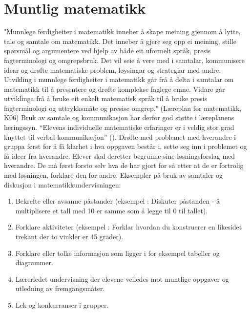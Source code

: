 \documentclass[12pt,twoside,onecolumn,norsk]{article}
\begin{document}
\section*{Muntlig matematikk}
"Munnlege ferdigheiter i matematikk inneber å skape meining gjennom å lytte, tale og 
samtale om matematikk. Det inneber å gjere seg opp ei meining, stille spørsmål og 
argumentere ved hjelp av både eit uformelt språk, presis fagterminologi og omgrepsbruk. 
Det vil seie å vere med i samtalar, kommunisere idear og drøfte matematiske problem, 
løysingar og strategiar med andre. Utvikling i munnlege ferdigheiter i matematikk går 
frå å delta i samtalar om matematikk til å presentere og drøfte komplekse faglege emne. 
Vidare går utviklinga frå å bruke eit enkelt matematisk språk til å bruke presis 
fagterminologi og uttrykksmåte og presise omgrep." (Læreplan for matematikk, K06)
\newline
\newline
Bruk av samtale og kommunikasjon har derfor god støtte i læreplanens læringssyn. 
``Elevens individuelle matematiske erfaringer er i veldig stor grad knyttet til 
verbal kommunikasjon'' ().
\newline
\newline
Drøfte med problemet med hverandre i gruppa først for å få klarhet i hva oppgaven 
består i, sette seg inn i problemet og få ideer fra hverandre. Elever skal deretter 
begrunne sine løsningsforslag med hverandre. De må først forsto selv hva de har gjort 
for så etter at de er fortrolig med løsningen, forklare den for andre.
\newline
\newline
Eksempler på bruk av samtaler og diskusjon i matematikkundervisningen:
\begin{enumerate}
\item Bekrefte eller avsanne påstander (eksempel : Diskuter påstanden - å multiplisere 
et tall med 10 er samme som å legge til 0 til tallet).
\item Forklare aktiviteter (eksempel : Forklar hvordan du konstruerer en likesidet 
trekant der to vinkler er 45 grader).
\item Forklare eller tolke informasjon som ligger i for eksempel tabeller og 
diagrammer.
\item Lærerledet undervisning der elevene veiledes mot muntlige oppgaver og utledning 
av fremgangsmåter.
\item Lek og konkurranser i grupper.
\end{enumerate}
\end{document}
